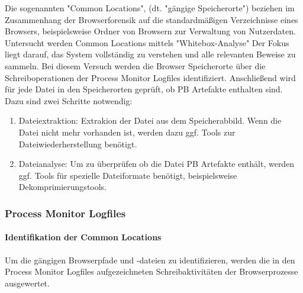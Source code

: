 Die sogenannten "Common Locations", (dt. "gängige Speicherorte") beziehen im Zusammenhang der Browserforensik auf die standardmäßigen Verzeichnisse eines Browsers, beispielsweise Ordner von Browsern zur Verwaltung von Nutzerdaten.
Untersucht werden Common Locations mittels "Whitebox-Analyse" \cite{Bonetti.2014}
Der Fokus liegt darauf, das System vollständig zu verstehen und alle relevanten Beweise zu sammeln.
Bei diesem Versuch werden die Browser Speicherorte über die Schreiboperationen der Process Monitor Logfiles identifiziert.
Anschließend wird für jede Datei in den Speicherorten geprüft, ob PB Artefakte enthalten sind.
Dazu sind zwei Schritte notwendig:
\begin{enumerate}
\item Dateiextraktion: Extrakion der Datei aus dem Speicherabbild. Wenn die Datei nicht mehr vorhanden ist, werden dazu ggf. Tools zur Dateiwiederherstellung benötigt.
\item Dateianalyse: Um zu überprüfen ob die Datei PB Artefakte enthält, werden ggf. Tools für spezielle Dateiformate benötigt, beispielsweise Dekomprimierungstools.
\end{enumerate}

\subsubsection*{Process Monitor Logfiles}

\paragraph*{Identifikation der Common Locations}
Um die gängigen Browserpfade und -dateien zu identifizieren, werden die in den Process Monitor Logfiles aufgezeichneten Schreibaktivitäten der Browserprozesse ausgewertet.

